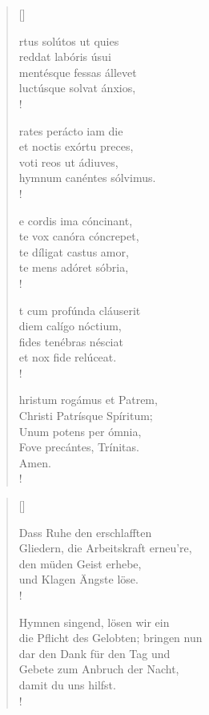 \begin{multicols}{2} 
\begin{verse}[\versewidth]
 
{\small{
rtus solútos ut quies\\
reddat labóris úsui\\
mentésque fessas állevet\\
luctúsque solvat ánxios,\\!

rates perácto iam die\\
et noctis exórtu preces,\\ 
voti reos ut ádiuves,\\ 
hymnum canéntes sólvimus.\\!

e cordis ima cóncinant, \\
te vox canóra cóncrepet, \\
te díligat castus amor, \\
te mens adóret sóbria, \\!

t cum profúnda cláuserit\\
diem calígo nóctium,\\ 
fides tenébras nésciat\\
et nox fide relúceat.\\!

hristum rogámus et Patrem,\\ 
Christi Patrísque Spíritum;\\
Unum potens per ómnia,\\ 
Fove precántes, Trínitas.\\
Amen.\\!}}
\end{verse}

\columnbreak

\begin{verse}[\versewidth]
 
{\small\rm{ Dass Ruhe den erschlafften\\
Gliedern, die Arbeitskraft erneu're,\\
den müden Geist erhebe,\\
und Klagen Ängste löse.\\!

 Hymnen singend, lösen wir ein\\
die Pflicht des Gelobten; bringen nun\\ 
dar den Dank für den Tag und\\
Gebete zum Anbruch der Nacht,\\
damit du uns hilfst.\\!

}}
\end{verse}
\end{multicols}
